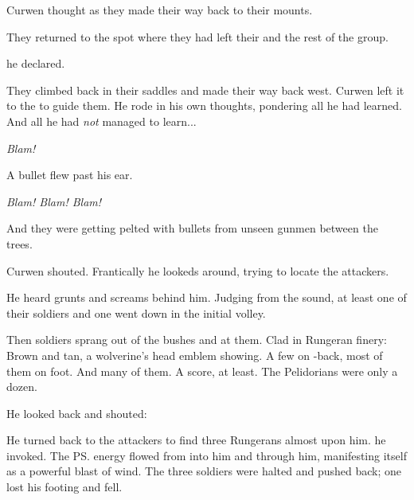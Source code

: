 \begin{comment}
\subsection{Curwen-tachi are attacked}
\end{comment}
\new
Curwen thought as they made their way back to their mounts. 

They returned to the spot where they had left their \relcs{} and the rest of the group. 

 he declared. 

They climbed back in their saddles and made their way back west. 
Curwen left it to the \rangers{} to guide them. 
He rode in his own thoughts, pondering all he had learned. 
And all he had \emph{not} managed to learn... 

\emph{Blam!} 

A bullet flew past his ear. 

\emph{Blam! Blam! Blam!} 

And they were getting pelted with bullets from unseen gunmen between the trees. 

 Curwen shouted. 
Frantically he lookeds around, trying to locate the attackers. 

He heard grunts and screams behind him. 
Judging from the sound, at least one of their soldiers and one \relc{} went down in the initial volley. 

Then soldiers sprang out of the bushes and at them. 
Clad in Rungeran finery: 
Brown and tan, a wolverine's head emblem showing. 
A few on \relc-back, most of them on foot. 
And many of them. 
A score, at least. 
The Pelidorians were only a dozen. 

He looked back and shouted: 

He turned back to the attackers to find three Rungerans almost upon him. 
 he invoked. 
The \ps{\sephirah} energy flowed from \Iquin{} into him and through him, manifesting itself as a powerful blast of wind. 
The three soldiers were halted and pushed back; one lost his footing and fell. 

